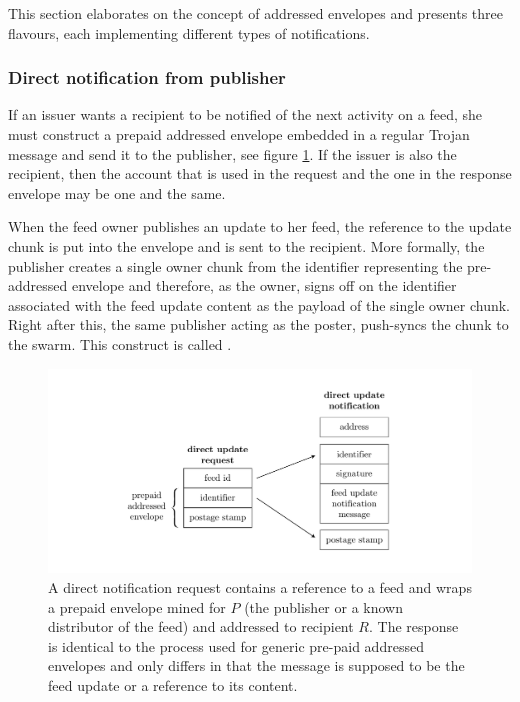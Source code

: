This section elaborates on the concept of addressed envelopes and presents three flavours, each implementing different types of notifications.

\subsubsection{Direct notification from publisher}

If an issuer wants a recipient to be notified of the next activity on a feed, she must construct a prepaid addressed envelope embedded in a regular Trojan message and send it to the publisher, see figure \ref{fig:direct-notification}. If the issuer is also the recipient, then the account that is used in the request and the one in the response envelope may be one and the same. 


When the feed owner publishes an update to her feed, the reference to the update chunk is put into the envelope and is sent to the recipient. More formally, the publisher creates a single owner chunk from the identifier representing the pre-addressed envelope and therefore, as the owner, signs off on the identifier associated with the feed update content as the payload of the single owner chunk. Right after this, the same publisher acting as the poster, push-syncs the chunk to the swarm. This construct is called . 

\begin{figure}[htbp]
   \centering
   \includegraphics[width=\textwidth]{fig/direct-notification.pdf}
   \caption[Direct notification request and response \statusgreen]{A direct notification request contains a reference to a feed and wraps a prepaid envelope mined for $P$ (the publisher or a known distributor of the feed) and addressed to recipient $R$. The response is identical to the process used for generic pre-paid addressed envelopes and only differs in that the message is supposed to be the feed update or a reference to its content.}
   \label{fig:direct-notification}
\end{figure}

